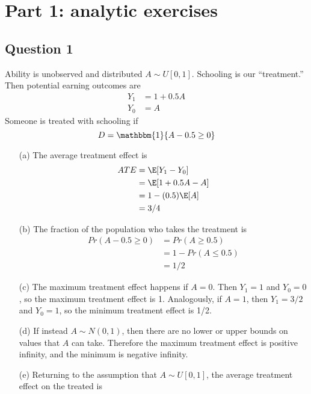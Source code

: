 \documentclass[12pt]{article}
\begin{document}
    
\section*{Part 1: analytic exercises}
\subsection*{Question 1}
Ability is unobserved and distributed $A \sim U[0,1]$. Schooling is our ``treatment.'' Then potential earning outcomes are 
    \begin{align*}
        Y_1 & = 1 + 0.5A \\
        Y_0 & = A        
    \end{align*}
Someone is treated with schooling if 
    \[D = \mathbbm{1}\{ A - 0.5 \ge 0 \} \]

\begin{enumerate}
    \item[(a)] The average treatment effect is 
        \begin{align*}
            ATE & = \E [ Y_1 - Y_0 ]     \\
                & = \E [ 1 + 0.5A - A]   \\
                & = 1 - (0.5) \E[A]      \\
                & = 3/4
        \end{align*} 
    \item[(b)] The fraction of the population who takes the treatment is 
        \begin{align*}
            Pr(A - 0.5 \ge 0) & = Pr(A \ge 0.5)     \\
                              & = 1 - Pr(A \leq 0.5)\\
                              & = 1/2
        \end{align*}  
    \item[(c)] The maximum treatment effect happens if $A=0$. Then $Y_1 = 1$ and $Y_0 = 0$, so the maximum treatment effect is 1. Analogously, if $A=1$, then $Y_1 = 3/2$ and $Y_0 = 1$, so the minimum treatment effect is 1/2. 
    \item[(d)] If instead $A\sim N(0,1)$, then there are no lower or upper bounds on values that $A$ can take. Therefore the maximum treatment effect is positive infinity, and the minimum is negative infinity. 
    \item[(e)] Returning to the assumption that $A\sim U[0,1]$, the average treatment effect on the treated is 
        \begin{align*}

\end{align*}
\end{enumerate}
\end{document}
